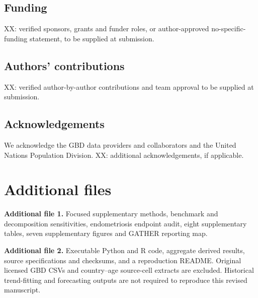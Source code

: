 \documentclass[11pt,a4paper]{article}
\begin{document}
\subsection*{Funding}
XX: verified sponsors, grants and funder roles, or author-approved no-specific-funding statement, to be supplied at submission.
\subsection*{Authors' contributions}
XX: verified author-by-author contributions and team approval to be supplied at submission.
\subsection*{Acknowledgements}
We acknowledge the GBD data providers and collaborators and the United Nations Population Division. XX: additional acknowledgements, if applicable.

\section*{Additional files}
\textbf{Additional file 1.} Focused supplementary methods, benchmark and decomposition sensitivities, endometriosis endpoint audit, eight supplementary tables, seven supplementary figures and GATHER reporting map.

\textbf{Additional file 2.} Executable Python and R code, aggregate derived results, source specifications and checksums, and a reproduction README. Original licensed GBD CSVs and country--age source-cell extracts are excluded. Historical trend-fitting and forecasting outputs are not required to reproduce this revised manuscript.
\end{document}
